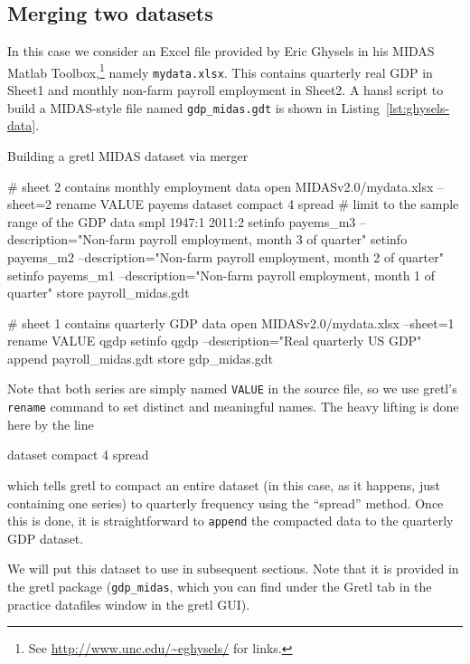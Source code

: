 \documentclass{article}
\begin{document}
\subsection{Merging two datasets}
\label{sec:data-merge}

In this case we consider an Excel file provided by Eric Ghysels in his
\textsf{MIDAS Matlab Toolbox},\footnote{See
  \url{http://www.unc.edu/~eghysels/} for links.} namely
\texttt{mydata.xlsx}.  This contains quarterly real GDP in Sheet1 and
monthly non-farm payroll employment in Sheet2. A hansl script to build
a MIDAS-style file named \texttt{gdp\_midas.gdt} is shown in
Listing~\ref{lst:ghysels-data}.

\begin{script}[htbp]
  \caption{Building a gretl MIDAS dataset via merger}
  \label{lst:ghysels-data}
\begin{scode}
# sheet 2 contains monthly employment data
open MIDASv2.0/mydata.xlsx --sheet=2
rename VALUE payems
dataset compact 4 spread
# limit to the sample range of the GDP data
smpl 1947:1 2011:2
setinfo payems_m3 --description="Non-farm payroll employment, month 3 of quarter"
setinfo payems_m2 --description="Non-farm payroll employment, month 2 of quarter"
setinfo payems_m1 --description="Non-farm payroll employment, month 1 of quarter"
store payroll_midas.gdt

# sheet 1 contains quarterly GDP data
open MIDASv2.0/mydata.xlsx --sheet=1
rename VALUE qgdp
setinfo qgdp --description="Real quarterly US GDP"
append payroll_midas.gdt
store gdp_midas.gdt
\end{scode}
\end{script}

Note that both series are simply named \texttt{VALUE} in the source
file, so we use gretl's \texttt{rename} command to set distinct and
meaningful names. The heavy lifting is done here by the line
%
\begin{code}
dataset compact 4 spread
\end{code}
%
which tells gretl to compact an entire dataset (in this case, as it
happens, just containing one series) to quarterly frequency using the
``spread'' method. Once this is done, it is straightforward to
\texttt{append} the compacted data to the quarterly GDP dataset.

We will put this dataset to use in subsequent sections. Note that it
is provided in the gretl package (\texttt{gdp\_midas}, which you can
find under the \textsf{Gretl} tab in the practice datafiles window
in the gretl GUI).
\end{document}
